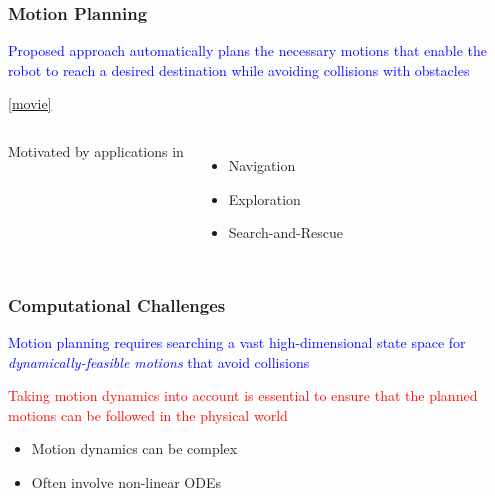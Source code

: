 \documentclass[10pt,t]{beamer}
\begin{document}
\begin{frame}
\frametitle{Motion Planning}


\textcolor{blue}{Proposed approach automatically plans the necessary
  motions that enable the robot to reach a desired destination while
  avoiding collisions with obstacles}

\vspace*{2mm}


\vspace*{-2mm}
\href{run:bumpy.wmv}{\footnotesize{\hfill{[movie]}}}
 
\begin{columns}

Motivated by applications in
\begin{itemize}
\item Navigation
\item Exploration
\item Search-and-Rescue
\end{itemize}



\end{columns}

\end{frame}


\begin{frame}
\frametitle{Computational Challenges}

\textcolor{blue}{Motion planning requires searching a vast high-dimensional state space
for \emph{dynamically-feasible motions} that avoid collisions}


\vspace*{4mm}

\textcolor{red}{Taking motion dynamics into account  is essential to ensure that
  the planned motions can be followed in the physical world}
 
\begin{itemize}
\item Motion dynamics can be complex 
\item Often involve non-linear ODEs
\end{itemize}


\end{frame}
\end{document}
